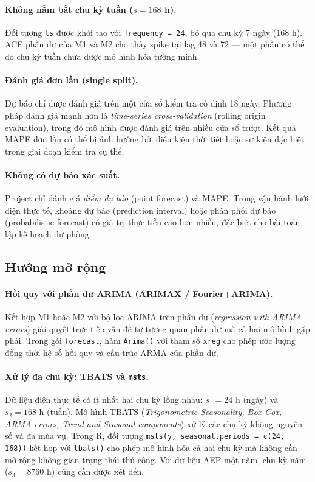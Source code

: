 \documentclass[12pt, a4paper]{article}
\theoremstyle{definition}
\begin{document}
\paragraph{Không nắm bắt chu kỳ tuần ($s = 168$ h).}
Đối tượng \texttt{ts} được khởi tạo với \texttt{frequency = 24}, bỏ qua chu
kỳ 7 ngày ($168$ h). ACF phần dư của M1 và M2 cho thấy spike tại lag 48 và 72
--- một phần có thể do chu kỳ tuần chưa được mô hình hóa tường minh.

\paragraph{Đánh giá đơn lần (single split).}
Dự báo chỉ được đánh giá trên một cửa sổ kiểm tra cố định 18 ngày. Phương
pháp đánh giá mạnh hơn là \emph{time-series cross-validation} (rolling
origin evaluation), trong đó mô hình được đánh giá trên nhiều cửa sổ trượt.
Kết quả MAPE đơn lần có thể bị ảnh hưởng bởi điều kiện thời tiết hoặc sự
kiện đặc biệt trong giai đoạn kiểm tra cụ thể.

\paragraph{Không có dự báo xác suất.}
Project chỉ đánh giá \emph{điểm dự báo} (point forecast) và MAPE. Trong vận
hành lưới điện thực tế, khoảng dự báo (prediction interval) hoặc phân phối dự
báo (probabilistic forecast) có giá trị thực tiễn cao hơn nhiều, đặc biệt
cho bài toán lập kế hoạch dự phòng.

\subsection{Hướng mở rộng}
\label{sec:future_work}

\paragraph{Hồi quy với phần dư ARIMA (ARIMAX / Fourier+ARIMA).}
Kết hợp M1 hoặc M2 với bộ lọc ARIMA trên phần dư (\emph{regression with ARIMA
errors}) giải quyết trực tiếp vấn đề tự tương quan phần dư mà cả hai mô hình
gặp phải. Trong gói \texttt{forecast}, hàm \texttt{Arima()} với tham số
\texttt{xreg} cho phép ước lượng đồng thời hệ số hồi quy và cấu trúc ARMA của
phần dư.

\paragraph{Xử lý đa chu kỳ: TBATS và \texttt{msts}.}
Dữ liệu điện thực tế có ít nhất hai chu kỳ lồng nhau: $s_1 = 24$ h (ngày) và
$s_2 = 168$ h (tuần). Mô hình TBATS (\emph{Trigonometric Seasonality, Box-Cox,
ARMA errors, Trend and Seasonal components}) xử lý các chu kỳ không nguyên số
và đa mùa vụ. Trong R, đối tượng \texttt{msts(y, seasonal.periods = c(24,
168))} kết hợp với \texttt{tbats()} cho phép mô hình hóa cả hai chu kỳ mà
không cần mở rộng không gian trạng thái thủ công. Với dữ liệu AEP một năm,
chu kỳ năm ($s_3 = 8760$ h) cũng cần được xét đến.
\end{document}
